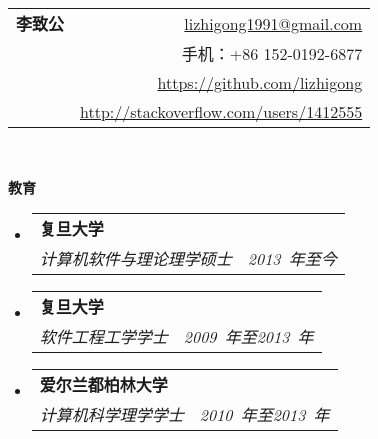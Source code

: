 \documentclass[letterpaper,10pt]{article}
\makeatletter
\newcommand{\resitem}[1]{\item #1 \vspace{-2pt}}
\newcommand{\resheading}[1]{{\large \colorbox{mygrey}{\begin{minipage}{\textwidth}{\textbf{#1 \vphantom{p\^{E}}}}\end{minipage}}}}
\newcommand{\ressubheading}[4]{
\begin{tabular*}{6.5in}{l@{\extracolsep{\fill}}r}
		\textbf{#1} & #2 \\
		#3 & #4 \\
\end{tabular*}\vspace{-6pt}}
\makeatother
\begin{document}
\newcommand{\mywebheader}{
\begin{tabular*}{7in}{l@{\extracolsep{\fill}}r}
	\textbf{{\Huge 李致公}} & \href{mailto:lizhigong1991@gmail.com}{lizhigong1991@gmail.com}\\
     & {手机：+86 152-0192-6877}\\
     & \href{https://github.com/lizhigong}{https://github.com/lizhigong} \\
     & \href{http://stackoverflow.com/users/1412555}{http://stackoverflow.com/users/1412555} \\
	\end{tabular*}
\\
\vspace{0.1in}}

\mywebheader


\resheading{教育}
	\begin{itemize}
       \item
			\ressubheading{复旦大学}{}{\emph{计算机软件与理论理学硕士}}{\emph{2013~年至今}}
                    


    \item
			\ressubheading{复旦大学}{}{\emph{软件工程工学学士}}{\emph{2009~年至2013~年}}
                    
	\item \ressubheading{爱尔兰都柏林大学}{}{\emph{计算机科学理学学士}}{\emph{2010~年至2013~年}}
	\end{itemize} %
\end{document}
